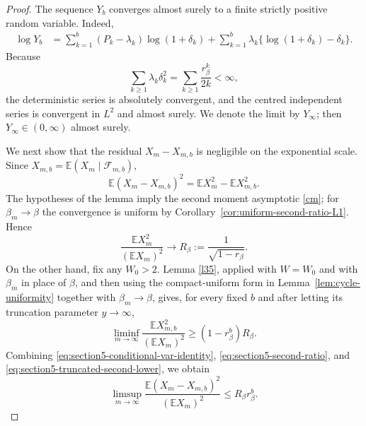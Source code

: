 \documentclass[11pt]{amsart}
\theoremstyle{plain}
\numberwithin{equation}{section}
\numberwithin{theorem}{section}
\numberwithin{figure}{section}
\begin{document}
\begin{proof}
The sequence $Y_b$ converges almost surely to a finite strictly positive random
variable.  Indeed,
\begin{align*}
\log Y_b
&=\sum_{k=1}^b (P_k-\lambda_k)\log(1+\delta_k)
  +\sum_{k=1}^b \lambda_k\{\log(1+\delta_k)-\delta_k\}.
\end{align*}
Because
\begin{equation}\label{eq:section5-l2-summable}
  \sum_{k\ge1}\lambda_k\delta_k^2
  =\sum_{k\ge1}\frac{r_\beta^k}{2k}<\infty,
\end{equation}
the deterministic series is absolutely convergent, and the centred independent
series is convergent in $L^2$ and almost surely.  We denote the limit by
$Y_\infty$; then $Y_\infty\in(0,\infty)$ almost surely.

We next show that the residual $X_m-X_{m,b}$ is negligible on the exponential
scale.  Since $X_{m,b}=\mathbb E(X_m\mid\mathcal F_{m,b})$,
\begin{equation}\label{eq:section5-conditional-var-identity}
  \mathbb E(X_m-X_{m,b})^2
  =\mathbb E X_m^2-\mathbb E X_{m,b}^2.
\end{equation}
The hypotheses of the lemma imply the second moment asymptotic \eqref{cm}; for
$\beta_m\to\beta$ the convergence is uniform by
Corollary~\ref{cor:uniform-second-ratio-L1}.  Hence
\begin{equation}\label{eq:section5-second-ratio}
  \frac{\mathbb E X_m^2}{(\mathbb E X_m)^2}
  \longrightarrow
  R_\beta:=\frac1{\sqrt{1-r_\beta}}.
\end{equation}
On the other hand, fix any $W_0>2$.  Lemma \ref{l35}, applied with $W=W_0$
and with $\beta_m$ in place of $\beta$, and then using the compact-uniform form in
Lemma~\ref{lem:cycle-uniformity} together with $\beta_m\to\beta$,
gives, for every fixed $b$ and after letting its truncation parameter $y\to\infty$,
\begin{equation}\label{eq:section5-truncated-second-lower}
  \liminf_{m\to\infty}\frac{\mathbb E X_{m,b}^2}{(\mathbb E X_m)^2}
  \ge (1-r_\beta^b)R_\beta .
\end{equation}
Combining \eqref{eq:section5-conditional-var-identity},
\eqref{eq:section5-second-ratio}, and \eqref{eq:section5-truncated-second-lower},
we obtain
\begin{equation}\label{eq:section5-residual-variance}
  \limsup_{m\to\infty}
  \frac{\mathbb E(X_m-X_{m,b})^2}{(\mathbb E X_m)^2}
  \le R_\beta r_\beta^b .
\end{equation}


\end{proof}
\end{document}
